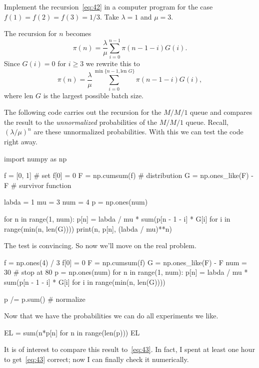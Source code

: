 \documentclass[companion]{subfiles}
\begin{document}
\begin{exercise}
 Implement the recursion~\cref{eq:42} in a computer program for the case $f(1)=f(2)=f(3)=1/3$.
 Take $\lambda =1$ and $\mu = 3$.
\begin{solution}
 The recursion for $n$ becomes
\begin{equation*}
\pi(n) = \frac \lambda \mu \sum_{i=0}^{n-1} \pi(n-1-i)G(i).
\end{equation*}
Since $G(i) =0$ for $i\geq 3$ we rewrite this to 
\begin{equation*}
 \pi(n) = \frac\lambda \mu \sum_{i=0}^{\min\{n-1,\text{len } G\}} \pi(n-1-i)G(i),
\end{equation*}
where $\text{len } G$ is the largest possible batch size.

The following code carries out the recursion for the $M/M/1$ queue and compares the result to the \emph{unnormalized} probabilities of the $M/M/1$ queue.
Recall, $(\lambda/\mu)^n$ are these unnormalized probabilities.
With this we can test the code right away.

\begin{pyconsole}
import numpy as np

f = [0, 1] # set f[0] = 0
F = np.cumsum(f) # distribution 
G = np.ones_like(F) - F # survivor function

labda = 1
mu = 3
num = 4
p = np.ones(num)

for n in range(1, num):
 p[n] = labda / mu * sum(p[n - 1 - i] * G[i] for i in range(min(n, len(G))))
 print(n, p[n], (labda / mu)**n)

\end{pyconsole}
The test is convincing. So now we'll move on the real problem. 

\begin{pyconsole}
f = np.ones(4) / 3
f[0] = 0
F = np.cumsum(f)
G = np.ones_like(F) - F
num = 30 # stop at 80
p = np.ones(num)
for n in range(1, num):
 p[n] = labda / mu * sum(p[n - 1 - i] * G[i] for i in range(min(n, len(G))))

p /= p.sum() # normalize
\end{pyconsole}

Now that we have the probabilities we can do all experiments we like. 
\begin{pyconsole}
EL = sum(n*p[n] for n in range(len(p)))
EL 
\end{pyconsole}

It is of interest to compare this result to~\cref{eq:43}.
In fact, I spent at least one hour to get~\cref{eq:43} correct; now I can finally check it numerically.



\end{solution}
\end{exercise}
\end{document}
